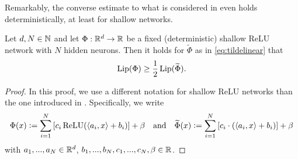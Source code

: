 Remarkably, the converse estimate to what is considered in  even holds deterministically, at least for shallow networks.
\begin{proposition}\label{prop:shallow_low_linear}
Let $d, N \in \mathbb{N}$ and let $\Phi: \mathbb{R}^d \to \mathbb{R}$ be a fixed (deterministic) shallow ReLU network with $N$ hidden neurons. Then it holds for $\widetilde{\Phi}$ as in \eqref{eq:tildelinear} that
\begin{equation*}
\operatorname{Lip}(\Phi) \geq \frac{1}{2} \operatorname{Lip}(\widetilde{\Phi}).
\end{equation*}
\end{proposition}
\begin{proof}
In this proof, we use a different notation for  shallow ReLU networks than the one introduced in . 
Specifically, we write 
\begin{equation*}
\Phi(x) \mathrel{\mathop:}= \sum_{i=1}^N \left[c_i \operatorname{ReLU}(\langle a_i, x \rangle + b_i)\right] + \beta \quad \text{and} \quad \widetilde{\Phi}(x) \mathrel{\mathop:}= \sum_{i=1}^N \left[c_i \cdot (\langle a_i, x \rangle + b_i)\right] + \beta
\end{equation*}
with $a_1, ..., a_N \in \mathbb{R}^d$, $b_1, ..., b_N, c_1, ..., c_N, \beta \in \mathbb{R}$.


\end{proof}
